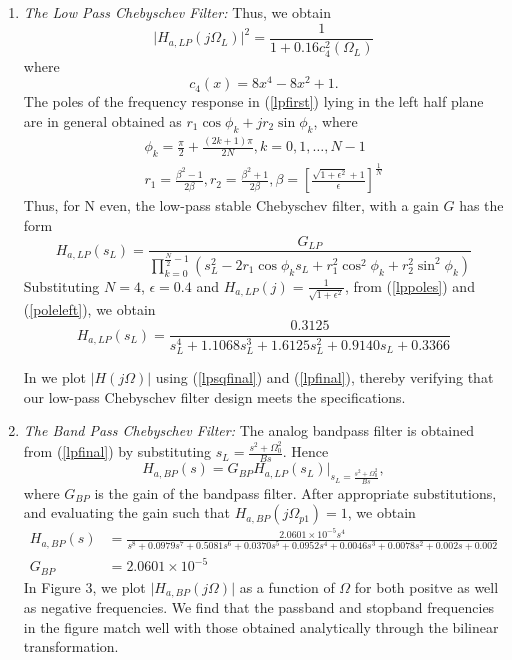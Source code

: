 \documentclass[article]{IEEEtran}
\theoremstyle{remark}
\numberwithin{equation}{subsection}
\begin{document}
\begin{enumerate}
\item {\em The Low Pass Chebyschev Filter:} Thus, we obtain
\begin{equation}
\label{lpsqfinal}
\vert H_{a,LP}(j\Omega_L)\vert^2 = \frac{1}{1 + 0.16c_4^2(\Omega_L)}
\end{equation}
where
\begin{equation}
c_4(x) = 8x^4 - 8x^2 + 1.	
\end{equation}
The poles of the frequency response in (\ref{lpfirst}) lying in the left half plane are in general obtained as 
$r_1\cos\phi_k + jr_2\sin \phi_k$, where
\begin{eqnarray}
\label{lppoles}
\phi_k = \frac{\pi}{2} + \frac{(2k+1)\pi}{2N}, k = 0, 1, \dots, N-1 \nonumber \\
r_1 = \frac{\beta^2 - 1}{2\beta}, r_2 = \frac{\beta^2 + 1}{2\beta}, \beta = \left[ \frac{\sqrt{1 + \epsilon^2} + 1}{\epsilon}\right]^{\frac{1}{N}}
\end{eqnarray}
Thus, for N even, the low-pass stable Chebyschev filter, with a gain $G$ has the form
\begin{equation}
\label{poleleft}
H_{a,LP}(s_L) = \frac{G_{LP}}{\prod_{k = 0}^{\frac{N}{2}-1}(s_L^2 - 2r_1\cos\phi_ks_L + r_1^2\cos^2\phi_k + r_2^2 \sin^2\phi_k)}
\end{equation}
Substituting $N = 4$, $\epsilon = 0.4$ and $H_{a,LP}(j) = \frac{1}{\sqrt{1+\epsilon^2}}$, from (\ref{lppoles}) and (\ref{poleleft}), we obtain 
\begin{equation}
\label{lpfinal}
H_{a,LP}(s_L) = \frac{0.3125}{s_L^4 + 1.1068s_L^3 + 1.6125s_L^2+0.9140s_L + 0.3366}
\end{equation}

In  we plot $|H(j\Omega)|$ using (\ref{lpsqfinal}) and (\ref{lpfinal}), thereby verifying that our low-pass Chebyschev filter design meets the specifications.
\item {\em The Band Pass Chebyschev Filter:}  The analog bandpass filter is obtained from (\ref{lpfinal}) by substituting
$s_L = \frac{s^2 + \Omega_0^2}{Bs}$.  Hence
\begin{equation}
H_{a,BP}(s) = G_{BP}H_{a,LP}(s_L)\vert_{s_L = \frac{s^2 + \Omega_0^2}{Bs}},
\end{equation}
where $G_{BP}$ is the gain of the bandpass filter.  After appropriate substitutions, and evaluating the gain 
such that $H_{a,BP}(j\Omega_{p1}) = 1$, we obtain
{\tiny
\begin{align}
\label{bpfinal}
H_{a,BP}(s) &= \frac{2.0601\times 10^{-5}s^4}{s^8+0.0979s^7+0.5081s^6+0.0370s^5+0.0952s^4+0.0046s^3+0.0078s^2+0.002s+0.002}\\
G_{BP} & = 2.0601\times 10^{-5}
\end{align}
}
In Figure 3, we plot $\vert H_{a,BP}(j\Omega)\vert$ as a function of $\Omega$ for both positve as
well as negative frequencies.  We find that the passband and stopband frequencies in the figure
match well with those obtained analytically through the bilinear transformation.
\end{enumerate}
\end{document}
